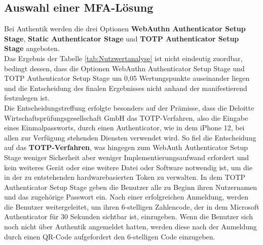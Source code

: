 \subsection{Auswahl einer MFA-Lösung}
\label{sec:Auswahl einer MFA-Lösung}
Bei Authentik werden die drei Optionen \textbf{WebAuthn Authenticator Setup Stage}, \textbf{Static Authenticator Stage} und 
\textbf{\acs{TOTP} Authenticator Setup Stage} angeboten. 
\\Das Ergebnis der Tabelle \ref*{tab:Nutzwertanalyse}  ist nicht eindeutig zuordbar, bedingt dessen, dass 
die Optionen WebAuthn Authenticator Setup Stage und \acs{TOTP} Authenticator Setup Stage um 0,05 Wertungspunkte auseinander liegen und 
die Entscheidung des finalen Ergebnisses nicht anhand der  manifestierend festzulegen ist.
\\Die Entscheidungstreffung erfolgte besonders auf der Prämisse, dass die Deloitte Wirtschaftsprüfungsgesellschaft GmbH das \acs{TOTP}-Verfahren, 
also die Eingabe eines Einmalpassworts, durch einen Authenticator, wie in dem iPhone 12, bei allen zur Verfügung 
stehenden Diensten verwendet wird. So fiel die Entscheidung auf das \textbf{\acs{TOTP}-Verfahren}, was hingegen zum WebAuth Authenticator 
Setup Stage weniger Sicherheit aber weniger Implementierungsaufwand erfordert und kein weiteres Gerät oder eine weitere Datei oder Software 
notwendig ist, um die in der zu entstehenden hardwarebasierten Token zu verwalten. In dem \acs{TOTP} Authenticator Setup Stage geben die 
Benutzer alle zu Beginn ihren Nutzernamen und das zugehörige Passwort ein. Nach einer erfolgreichen Anmeldung, werden die 
Benutzer weitergeleitet, um ihren 6-stelligen Zahlencode, der in dem Microsoft Authenticator für 30 Sekunden sichtbar ist, einzugeben. 
Wenn die Benutzer sich noch nicht über Authentik angemeldet hatten, werden diese nach der Anmeldung durch einen QR-Code aufgefordert 
den 6-stelligen Code einzugeben.

